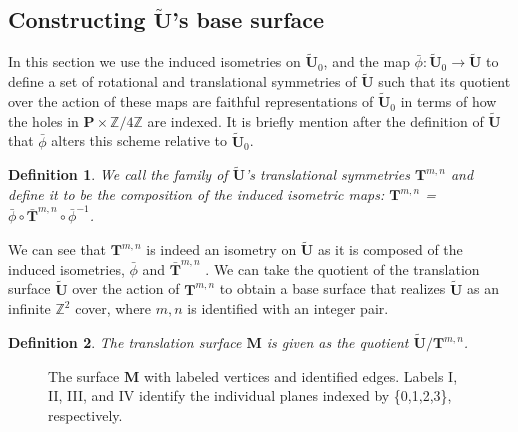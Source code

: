 \documentclass[]{article}
\newtheorem{Def}{Definition}[subsection]
\begin{document}

\subsection{Constructing $\tilde{\mathbf{U}}$'s base surface}
In this section we use the induced isometries on $\tilde{\mathbf{U}}_0$, and the map $\bar{\phi}:\tilde{\mathbf{U}}_0\rightarrow\tilde{\mathbf{U}}$ to define a set of rotational and translational symmetries of $\tilde{\mathbf{U}}$ such that its quotient over the action of these maps are faithful representations of $\tilde{\mathbf{U}}_0$ in terms of how the holes in $\mathbf{P}\times\mathbb{Z}/4\mathbb{Z}$ are indexed. It is briefly mention after the definition of $\tilde{\mathbf{U}}$ that $\bar{\phi}$ alters this scheme relative to $\tilde{\mathbf{U}}_0$. 

\begin{Def}We call the {family of $\tilde{\mathbf{U}}$'s translational symmetries} $\mathbf{T}^{m,n}$ and define it to be the composition of the induced isometric maps: $\mathbf{T}^{m,n}$ = $\bar{\phi}\circ\bar{\mathbf{T}}^{m,n}\circ\bar{\phi}^{-1}$.
\end{Def}

We can see that $\mathbf{T}^{m,n}$ is indeed an isometry on $\tilde{\mathbf{U}}$ as it is composed of the induced isometries, $\bar{\phi}$ and $\bar{\mathbf{T}}^{m,n}$ . We can take the quotient of the translation surface $\tilde{\mathbf{U}}$ over the action of $\mathbf{T}^{m,n}$ to obtain a base surface that realizes $\tilde{\mathbf{U}}$ as an infinite $\mathbb{Z}^2$ cover, where $m,n$ is identified with an integer pair.

\begin{Def}
The translation surface $\mathbf{M}$ is given as the quotient  $\tilde{\mathbf{U}}/\mathbf{T}^{m,n}$.
\end{Def} 

\begin{figure}[H]
\centering

\caption{The surface $\mathbf{M}$ with labeled vertices and identified edges. Labels I, II, III, and IV identify the individual planes indexed by \{0,1,2,3\}, respectively.}
\label{fig:mtilda}
\end{figure}
\end{document}

